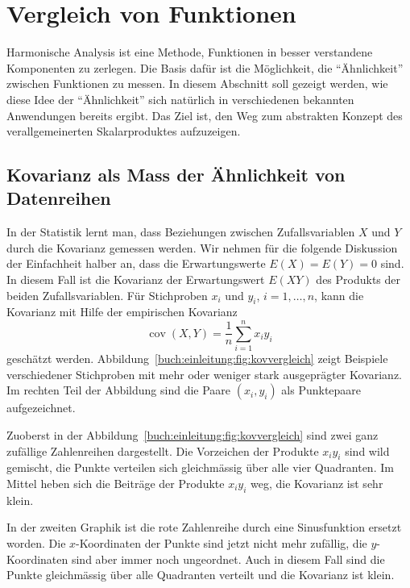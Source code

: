 %
%
%
\section{Vergleich von Funktionen
\label{buch:einleitung:section:vergleich}}
Harmonische Analysis ist eine Methode, Funktionen in besser
verstandene Komponenten zu zerlegen.
Die Basis dafür ist die Möglichkeit, die ``Ähnlichkeit'' zwischen
Funktionen zu messen.
In diesem Abschnitt soll gezeigt werden, wie diese Idee der
``Ähnlichkeit'' sich natürlich in verschiedenen bekannten
Anwendungen bereits ergibt.
Das Ziel ist, den Weg zum abstrakten Konzept des verallgemeinerten
Skalarproduktes aufzuzeigen.
%

%
%
\subsection{Kovarianz als Mass der Ähnlichkeit von Datenreihen}
In der Statistik lernt man, dass Beziehungen zwischen Zufallsvariablen
%
$X$ und $Y$ durch die Kovarianz gemessen werden.
%
Wir nehmen für die folgende Diskussion der Einfachheit halber an,
dass die Erwartungswerte $E(X)=E(Y)=0$ sind.
%
In diesem Fall ist die Kovarianz der Erwartungswert $E(XY)$ des
Produkts der beiden Zufallsvariablen.
Für Stichproben $x_i$ und $y_i$, $i=1,\dots,n$, kann die Kovarianz mit
Hilfe der empirischen Kovarianz
\[
\operatorname{cov}(X,Y)
=
\frac{1}{n}
\sum_{i=1}^n x_iy_i
\]
geschätzt werden.
Abbildung~\ref{buch:einleitung:fig:kovvergleich} zeigt Beispiele
verschiedener Stichproben mit mehr oder weniger stark ausgeprägter
Kovarianz.
Im rechten Teil der Abbildung sind die Paare $(x_i,y_i)$ als
Punktepaare aufgezeichnet.



Zuoberst in der Abbildung~\ref{buch:einleitung:fig:kovvergleich}
sind zwei ganz zufällige Zahlenreihen dargestellt.
Die Vorzeichen der Produkte $x_iy_i$ sind wild gemischt, die Punkte
verteilen sich gleichmässig über alle vier Quadranten.
Im Mittel heben sich die Beiträge der Produkte $x_iy_i$ weg, die
Kovarianz ist sehr klein.

In der zweiten Graphik ist die rote Zahlenreihe durch eine Sinusfunktion
ersetzt worden.
Die $x$-Koordinaten der Punkte sind jetzt nicht mehr zufällig, die
$y$-Koordinaten sind aber immer noch ungeordnet. 
Auch in diesem Fall sind die Punkte gleichmässig über alle Quadranten
verteilt und die Kovarianz ist klein.

